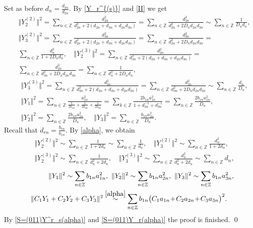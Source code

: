 \documentclass[preprint,12pt]{elsarticle}
\numberwithin{equation}{section}
\begin{document}
\begin{pf}
Set as before $d_n=\frac{d_{3n}}{d_{2n}}$.
%
By \eqref{Y_r^{(s)}} and \eqref{II} we get 
{\small
\begin{eqnarray*}
\nonumber
 && \Vert Y_2^{(2)}\Vert^2\!=\!\sum_{n\in \mathbb Z}\frac{d_{2n}^2}{d_{2n}^2+\!2(d_{2n}+d_{3n}\!+\!d_{2n}d_{3n})}\!=\!
\sum_{n\in \mathbb Z}\frac{d_{2n}^2}{d_{2n}^2\!+\!2D_nd_{2n}d_{3n}}\!\sim\! \sum_{n\in \mathbb Z}\frac{1}{D_nd_n},\\ 
% 
\nonumber
 &&
 \Vert Y_3^{(2)} \Vert^2\!=\!\sum_{n\in \mathbb Z}\frac{d_{3n}^2}{d_{2n}^2\!+\!2(d_{2n}\!+\!d_{3n}\!+\!d_{2n}d_{3n})}=
\sum_{n\in \mathbb Z}\frac{d_{3n}^2}{d_{2n}^2\!+\!2D_nd_{2n}d_{3n}}=  \\
 \nonumber
 &&
\sum_{n\in \mathbb Z}\frac{d_n^2}{1+2D_nd_n},\quad  
 \Vert Y_2^{(3)} \Vert^2=\sum_{n\in \mathbb Z}\frac{d_{2n}^2}{d_{3n}^2+2(d_{2n}\!+\!d_{3n}\!+\!d_{2n}d_{3n})}
=\\
&&
\sum_{n\in \mathbb Z}\frac{d_{2n}^2}{d_{3n}^2\!+\!2D_nd_{2n}d_{3n}}= \sum_{n\in \mathbb Z}\frac{1}{d_n^2+2D_nd_n},
 \end{eqnarray*}
 \begin{eqnarray}
\nonumber
 &&\Vert Y_3^{(3)}\Vert^2=\sum_{n\in \mathbb Z}\frac{d_{3n}^2}{d_{3n}^2+2(d_{2n}\!+\!d_{3n}\!+\!d_{2n}d_{3n})}
  =\sum_{n\in \mathbb Z}\frac{d_{3n}^2}{d_{3n}^2\!+\!2D_nd_{2n}d_{3n}}\sim \sum_{n\in \mathbb Z}\frac{d_n}{D_n},\\
 \nonumber 
 &&\Vert Y_1\Vert^2=\sum_{n\in \mathbb Z}\frac{a_{1n}^2}{\frac{1}{2b_{1n}}+\frac{1}{2b_{2n}}+\frac{1}{2b_{3n}}}= 
\sum_{k\in \mathbb Z}\frac{2b_{1n}a_{1n}^2}{1+d_{2n}^{-1}+d_{3n}^{-1}}=
\sum_{n\in \mathbb Z}\frac{2b_{1n}a_{1n}^2}{D_n},\\
\label{Y_r(011)}
&&\Vert Y_2 \Vert^2=
\sum_{n\in \mathbb Z}\frac{2b_{1n}a_{2n}^2}{D_n},\quad
\Vert Y_3\Vert^2=
\sum_{n\in \mathbb Z}\frac{b_{1n}a_{3n}^2}{D_n}.
\end{eqnarray}
}
Recall that
$d_{rn}\!=\!\frac{b_{rn}}{b_{1n}}$. By \eqref{alpha}, we obtain
\begin{eqnarray}
\label{S=(011)Y^r_s(alpha)}
&& \Vert Y_2^{(2)}\Vert^2\sim \sum_{n\in \mathbb Z}\frac{1}{1+2d_n}
\sim \sum_{n\in \mathbb Z}\frac{1}{d_n},\quad
 \Vert Y_3^{(2)} \Vert^2\sim \sum_{n\in \mathbb Z}\frac{d_n^2}{1+2d_n},\\
 \nonumber
&&\Vert Y_2^{(3)} \Vert^2\sim \sum_{n\in \mathbb Z}\frac{1}{d_n^2+2d_n},\quad
\Vert Y_3^{(3)}\Vert^2 \sim \sum_{n\in \mathbb Z}\frac{d_n^2}{d_n^2+2d_n}
\sim \sum_{n\in \mathbb Z}d_n,
\end{eqnarray}
\begin{eqnarray}
 \nonumber
&&\Vert Y_1\Vert^2\sim \sum_{n\in \mathbb Z}b_{1n}a_{1n}^2,\,\,
\Vert Y_2\Vert^2\sim \sum_{n\in \mathbb Z}b_{1n}a_{2n}^2,\,\,
\Vert Y_3\Vert^2\sim \sum_{n\in \mathbb Z}b_{1n}a_{3n}^2,\\
\label{S=(011)Y_r(alpha)}
&&
\Vert C_1Y_1+C_2Y_2+C_3 Y_3\Vert^2\stackrel{\eqref{alpha}}{\sim}\sum_{n\in \mathbb Z}b_{1n}\big(C_1a_{1n}\!+\!C_2a_{2n}\!+\!C_3a_{3n}\big)^2.\quad
\end{eqnarray}
By \eqref{S=(011)Y^r_s(alpha)} and \eqref{S=(011)Y_r(alpha)}
the proof is finished.
\qed\end{pf}
%
\end{document}
